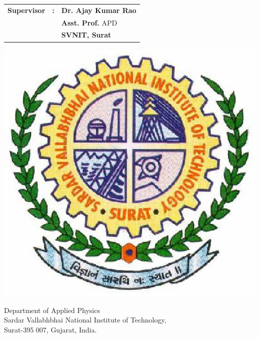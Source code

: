 \documentclass[draft,11pt]{scrreprt}
\begin{document}
\vspace*{25pt}
\begin{flushright}
\begin{tabular}{lll}
\textbf{Supervisor} & \textbf{:} & \textbf{Dr. Ajay Kumar Rao}\\
& & \textbf{Asst. Prof.} APD\\
& & \textbf{SVNIT, Surat}

\end{tabular}
\end{flushright}

\newpage
\begin{minipage}{0.3\textwidth}
\begin{center}
\includegraphics[scale=0.25]{svnit}
\end{center}

\end{minipage}
\hfill
\begin{minipage}{0.65\textwidth}
\large Department of Applied Physics\\
Sardar Vallabhbhai National Institute of Technology,\\
Surat-395 007, Gujarat, India.

\end{minipage}
\vspace*{10pt}\\
\end{document}

